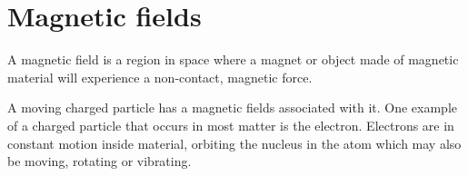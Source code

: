 
    \section*{Magnetic fields}
      \label{m37830*id128332}A magnetic field is a region in space where a magnet or object made of magnetic material will experience a non-contact, magnetic force.\par 
      \label{m37830*id128337}A moving charged particle has a magnetic fields associated with it. One example of a charged particle that occurs in most matter is the electron. Electrons are in constant motion inside material, orbiting the nucleus in the atom which may also be moving, rotating or vibrating.  

